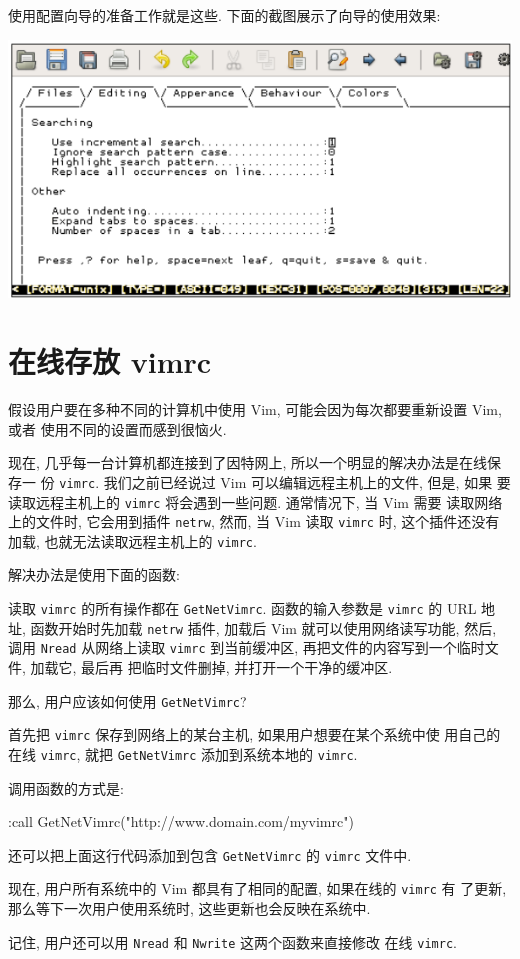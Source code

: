 使用配置向导的准备工作就是这些. 下面的截图展示了向导的使用效果:
\begin{center}
\includegraphics[scale=0.7]{./images/page221.png}
\end{center}

\section{在线存放 vimrc}
\label{sec:storing_vimrc_online}

假设用户要在多种不同的计算机中使用 Vim, 可能会因为每次都要重新设置 Vim, 或者
使用不同的设置而感到很恼火.

现在, 几乎每一台计算机都连接到了因特网上, 所以一个明显的解决办法是在线保存一
份 \texttt{vimrc}. 我们之前已经说过 Vim 可以编辑远程主机上的文件, 但是, 如果
要读取远程主机上的 \texttt{vimrc} 将会遇到一些问题. 通常情况下, 当 Vim 需要
读取网络上的文件时, 它会用到插件 \texttt{netrw}, 然而, 当 Vim 读取
\texttt{vimrc} 时, 这个插件还没有加载, 也就无法读取远程主机上的 \texttt{vimrc}.

解决办法是使用下面的函数:
读取 \texttt{vimrc} 的所有操作都在 \texttt{GetNetVimrc}. 函数的输入参数是
\texttt{vimrc} 的 URL 地址, 函数开始时先加载 \texttt{netrw} 插件, 加载后
Vim 就可以使用网络读写功能, 然后, 调用 \texttt{Nread} 从网络上读取
\texttt{vimrc} 到当前缓冲区, 再把文件的内容写到一个临时文件, 加载它, 最后再
把临时文件删掉, 并打开一个干净的缓冲区.

那么, 用户应该如何使用 \texttt{GetNetVimrc}?

首先把 \texttt{vimrc} 保存到网络上的某台主机, 如果用户想要在某个系统中使
用自己的在线 \texttt{vimrc}, 就把 \texttt{GetNetVimrc} 添加到系统本地的
\texttt{vimrc}.

调用函数的方式是:
\begin{vimcode}
:call GetNetVimrc("http://www.domain.com/myvimrc")
\end{vimcode}
还可以把上面这行代码添加到包含 \texttt{GetNetVimrc} 的 \texttt{vimrc} 文件中.

现在, 用户所有系统中的 Vim 都具有了相同的配置, 如果在线的 \texttt{vimrc} 有
了更新, 那么等下一次用户使用系统时, 这些更新也会反映在系统中.

记住, 用户还可以用 \texttt{Nread} 和 \texttt{Nwrite} 这两个函数来直接修改
在线 \texttt{vimrc}.

